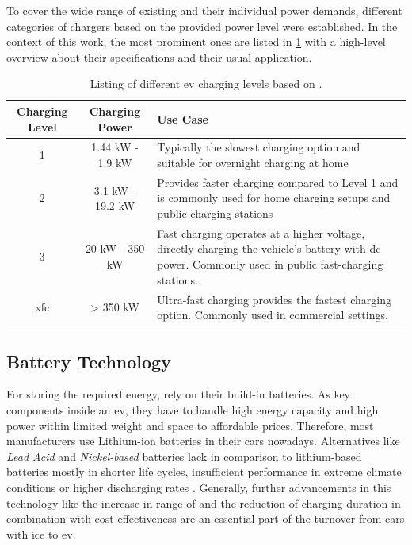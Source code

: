 \noindent To cover the wide range of existing  and their individual power demands, different categories of chargers based on the provided power level were established. In the context of this work, the most prominent ones are listed in \ref{tab:ev-charging-levels} with a high-level overview about their specifications and their usual application. 

\begingroup
\setlength{\tabcolsep}{10pt} %
\renewcommand{\arraystretch}{1.5} %
\begin{table}[h]
    \centering
    \caption{Listing of different \acrshort{ev} charging levels based on \cite{acharige_review_2023}.}
    \begin{tabular}{c|c|m{6.5cm}}
        Charging Level & Charging Power & Use Case \\ \hline
         1 & 1.44 \acrshort{kW} - 1.9 \acrshort{kW} & Typically the slowest charging option and suitable for overnight charging at home \\
         2 & 3.1 \acrshort{kW} - 19.2 \acrshort{kW} & Provides faster charging compared to Level 1 and is commonly used for home charging setups and public charging stations \\
         3 & 20 \acrshort{kW} - 350 \acrshort{kW} & Fast charging operates at a higher voltage, directly charging the vehicle's battery with \acrshort{dc} power. Commonly used in public fast-charging stations.\\
         \acrshort{xfc} & > 350 \acrshort{kW} & Ultra-fast charging provides the fastest charging option. Commonly used in commercial settings.
    \end{tabular}
    \label{tab:ev-charging-levels}
\end{table}
\endgroup

\newpage

\subsection{Battery Technology}
\label{ch:Fundamentals:sec:Electric Mobility:ssec:Battery Technology}

For storing the required energy,  rely on their build-in batteries. As key components inside an \acrshort{ev}, they have to handle high energy capacity and high power within limited weight and space to affordable prices.
Therefore, most manufacturers use Lithium-ion batteries in their cars nowadays. 
Alternatives like \textit{Lead Acid} and \textit{Nickel-based} batteries lack in comparison to lithium-based batteries mostly in shorter life cycles, insufficient performance in extreme climate conditions or higher discharging rates \cite{acharige_review_2023}.
Generally, further advancements in this technology like the increase in range of  and the reduction of charging duration in combination with cost-effectiveness are an essential part of the turnover from cars with \acrshort{ice} to \acrshort{ev}.

